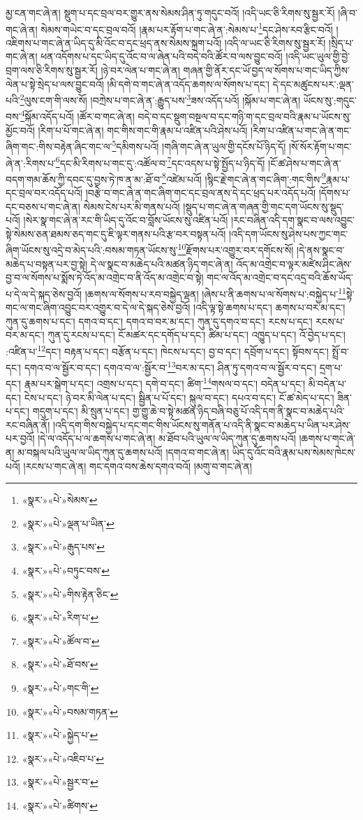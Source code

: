 མྱ་ངན་གང་ཞེ་ན། སྡུག་པ་དང་བྲལ་བར་གྱུར་ནས་སེམས་ཤིན་ཏུ་གདུང་བའོ། །འདི་ཡང་ཅི་རིགས་སུ་སྦྱར་རོ། །ཞི་བ་གང་ཞེ་ན། སེམས་གཡེང་བ་དང་བྲལ་བའོ། །རྣམ་པར་རྟོག་པ་གང་ཞེ་ན་:སེམས་པ་\footnote{«སྣར་»«པེ་»སེམས་}དང་ཤེས་རབ་རྩིང་བའོ། །འཇིགས་པ་གང་ཞེ་ན་ཡིད་དུ་མི་འོང་བ་དང་ཕྲད་ནས་སེམས་སྐྲག་པའོ། །འདི་ལ་ཡང་ཅི་རིགས་སུ་སྦྱར་རོ། །སྲིད་པ་གང་ཞེ་ན། ཕན་འདོགས་པ་དང་ཡིད་དུ་འོང་བ་ལ་ཞེན་པའི་བདེ་བའི་ཚོར་བ་ལས་བྱུང་བའོ། །འདི་ཡང་ཡུལ་གྱི་བྱེ་བྲག་ལས་ཅི་རིགས་སུ་སྦྱར་རོ། །ཉེ་བར་ལེན་པ་གང་ཞེ་ན། གཞན་གྱི་ནོར་དང་ཡོ་བྱད་ལ་སོགས་པ་གང་ཡིད་ཀྱིས་ལེན་པ་སྟེ་སྲེད་པ་ལས་བྱུང་བའོ། །མི་དགེ་བ་གང་ཞེ་ན་འདོད་ཆགས་ལ་སོགས་པ་དང་། དེ་དང་མཚུངས་པར་:ལྡན་པའི་\footnote{«སྣར་»«པེ་»ལྡན་པ་ཡིན་}ལུས་ངག་གི་ལས་སོ། །བཀྲེས་པ་གང་ཞེ་ན་:རྒྱུད་པས་\footnote{«སྣར་»«པེ་»རྒུད་པས་}ཟས་འདོད་པའོ། །སྐོམ་པ་གང་ཞེ་ན། ཡོངས་སུ་:གདུང་བས་\footnote{«སྣར་»«པེ་»བཏུང་བས་}སྐོམ་འདོད་པའོ། །ཚོར་བ་གང་ཞེ་ན། བདེ་བ་དང་སྡུག་བསྔལ་བ་དང་གཉི་ག་དང་བྲལ་བའི་རྣམ་པ་ཡོངས་སུ་མྱོང་བའོ། །རིག་པ་པོ་གང་ཞེ་ན། གང་གིས་གང་གི་རྣམ་པ་འཛིན་པའི་ཤེས་པའོ། །རིག་པ་འཛིན་པ་གང་ཞེ་ན་གང་ཞིག་གང་:གིས་བརྟེན་ཞིང་གང་ལ་\footnote{«སྣར་»«པེ་»གིས་རྟེན་ཅིང་}དམིགས་པའོ། །གཞི་གང་ཞེ་ན་ཡུལ་གྱི་དངོས་པོ་ཉིད་དོ། །སོ་སོར་རྟོག་པ་གང་ཞེ་ན་:རིགས་པ་\footnote{«སྣར་»«པེ་»རིག་པ་}དང་མི་རིགས་པ་གང་དུ་:འཚོལ་བ་\footnote{«སྣར་»«པེ་»ཚོལ་བ་}དང་འདས་པ་སྟེ་སྤྱོད་པ་ཉིད་དོ། །ངོ་ཚ་ཤེས་པ་གང་ཞེ་ན་བདག་གམ་ཆོས་ཀྱི་དབང་དུ་བྱས་ཏེ་ཁ་ན་མ་:ཐོ་བ་\footnote{«སྣར་»«པེ་»ཐོ་བས་}འཛེམ་པའོ། །སྙིང་རྗེ་གང་ཞེ་ན་གང་ཞིག་:གང་གིས་\footnote{«སྣར་»«པེ་»གང་གི་}རྣམ་པ་དང་བྲལ་བར་འདོད་པའོ། །བརྩེ་བ་གང་ཞེ་ན་གང་ཞིག་གང་དང་བྲལ་ནས་དེ་དང་ཕྲད་པར་འདོད་པའོ། །དོགས་པ་དང་བཅས་པ་གང་ཞེ་ན། སེམས་ངེས་པར་མི་གནས་པའོ། །སྡུད་པ་གང་ཞེ་ན་གཞན་གྱི་གང་དག་ཡོངས་སུ་སྡུད་པའོ། །སེར་སྣ་གང་ཞེ་ན་རང་གི་ཡིད་དུ་འོང་བ་བློས་ཡོངས་སུ་འཛིན་པའོ། །རང་བཞིན་འདི་དག་སྣང་བ་ལས་འབྱུང་སྟེ་སེམས་ཅན་ཐམས་ཅད་གང་དུ་ཇི་ལྟར་གནས་པའི་རྩ་བར་བསྟན་པའོ། །འདི་དག་ཡོངས་སུ་ཤེས་པས་ཀྱང་གང་ཞིག་ཡོངས་སུ་འདྲེ་བ་མེད་པའི་:བསམ་གཏན་ཡོངས་སུ་\footnote{«སྣར་»«པེ་»བསམ་གཏན་}རྫོགས་པར་འགྱུར་བར་དགོངས་སོ། །དེ་ནས་སྣང་བ་མཆེད་པ་བསྟན་པར་བྱ་སྟེ། དེ་ལ་སྣང་བ་མཆེད་པའི་མཚན་ཉིད་གང་ཞེ་ན། འོད་མ་འགྲེང་བ་ལྟར་མཛེས་ཤིང་ཞེས་བྱ་བ་ལ་སོགས་པ་སྨོས་ཏེ་འོད་མ་འགྲེང་བ་ནི་འོད་མ་འགྲེང་བ་སྟེ། གང་ལ་འོད་མ་འགྲེང་བ་དང་འདྲ་བའི་ཆོས་ཡོད་པ་དེ་ལ་དེ་སྐད་ཅེས་བྱའོ། །ཆགས་ལ་སོགས་པ་རབ་བསྐྱེད་ལྡན། །ཞེས་པ་ནི་ཆགས་པ་ལ་སོགས་པ་:བསྐྱེད་པ་\footnote{«སྣར་»«པེ་»སྐྱེད་པ་}སྟེ་གང་ལ་གང་ཞིག་འབྱུང་བར་འགྱུར་བ་དེ་ལ་དེ་སྐད་ཅེས་བྱའོ། །འདི་ལྟ་སྟེ་ཆགས་པ་དང་། ཆགས་པ་བར་མ་དང་། ཀུན་དུ་ཆགས་པ་དང་། དགའ་བ་དང་། དགའ་བ་བར་མ་དང་། ཀུན་དུ་དགའ་བ་དང་། རངས་པ་དང་། རངས་པ་བར་མ་དང་། ཀུན་དུ་རངས་པ་དང་། ངོ་མཚར་དང་དགོད་པ་དང་། ཚིམ་པ་དང་། འཁྱུད་པ་དང་། འོ་བྱེད་པ་དང་། :འཛིན་པ་\footnote{«སྣར་»«པེ་»འཇིབ་པ་}དང་། བརྟན་པ་དང་། བརྩོན་པ་དང་། ཁེངས་པ་དང་། བྱ་བ་དང་། དབྲོག་པ་དང་། སྟོབས་དང་། སྤྲོ་བ་དང་། དགའ་བ་ལ་སྦྱོར་བ་དང་། དགའ་བ་ལ་:སྦྱོར་བ་\footnote{«སྣར་»«པེ་»སྦྱར་བ་}བར་མ་དང་། ཤིན་ཏུ་དགའ་བ་ལ་སྦྱོར་བ་དང་། དྲག་པ་དང་། རྣམ་པར་སྒེག་པ་དང་། འགྲས་པ་དང་། དགེ་བ་དང་། ཚིག་\footnote{«སྣར་»«པེ་»ཚིགས་}གསལ་བ་དང་། བདེན་པ་དང་། མི་བདེན་པ་དང་། ངེས་པ་དང་། ཉེ་བར་མི་ལེན་པ་དང་། སྦྱིན་པ་པོ་དང་། སྐུལ་བ་དང་། དཔའ་བ་དང་། ངོ་ཚ་མེད་པ་དང་། ཟིན་པ་དང་། གདུག་པ་དང་། མི་སྲུན་པ་དང་། གྱ་གྱུ་ཆེ་བ་སྟེ་མཚན་ཉིད་བཞི་བཅུ་པོ་འདི་དག་ནི་སྣང་བ་མཆེད་པའི་རང་བཞིན་ནོ། །འདི་དག་གིས་བསྐྱེད་པ་དང་གང་གིས་ཡོངས་སུ་གནོན་པ་འདི་ནི་སྣང་བ་མཆེད་པ་ཡིན་པར་ཤེས་པར་བྱའོ། །དེ་ལ་འདོད་པ་ལ་ཆགས་པ་གང་ཞེ་ན། མ་ཐོབ་པའི་ཡུལ་ལ་ཡིད་ཀུན་དུ་ཆགས་པའོ། །ཆགས་པ་གང་ཞེ་ན། མ་བསྐལ་པའི་ཡུལ་ལ་ཡིད་ཀུན་དུ་ཆགས་པའོ། །དགའ་བ་གང་ཞེ་ན། ཡིད་དུ་འོང་བའི་རྣམ་པས་སེམས་ཁེངས་པའོ། །རངས་པ་གང་ཞེ་ན། གང་དགའ་བས་ཆེས་དགའ་བའོ། །མགུ་བ་གང་ཞེ་ན། 